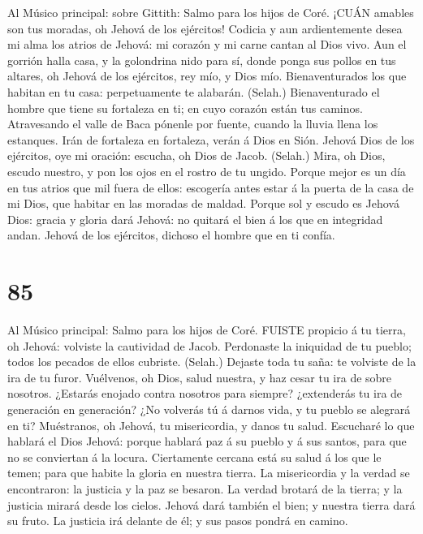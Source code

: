  Al Músico principal: sobre Gittith: Salmo para los hijos de
Coré. ¡CUÁN amables son tus moradas, oh Jehová de los ejércitos!
 Codicia y aun ardientemente desea mi alma los atrios de
Jehová: mi corazón y mi carne cantan al Dios vivo.  Aun el
gorrión halla casa, y la golondrina nido para sí, donde ponga sus pollos
en tus altares, oh Jehová de los ejércitos, rey mío, y Dios mío.
 Bienaventurados los que habitan en tu casa: perpetuamente
te alabarán. (Selah.)  Bienaventurado el hombre que tiene su
fortaleza en ti; en cuyo corazón están tus caminos. 
Atravesando el valle de Baca pónenle por fuente, cuando la lluvia llena
los estanques.  Irán de fortaleza en fortaleza, verán á Dios
en Sión.  Jehová Dios de los ejércitos, oye mi oración:
escucha, oh Dios de Jacob. (Selah.)  Mira, oh Dios, escudo
nuestro, y pon los ojos en el rostro de tu ungido.  Porque
mejor es un día en tus atrios que mil fuera de ellos: escogería antes
estar á la puerta de la casa de mi Dios, que habitar en las moradas de
maldad.  Porque sol y escudo es Jehová Dios: gracia y
gloria dará Jehová: no quitará el bien á los que en integridad andan.
 Jehová de los ejércitos, dichoso el hombre que en ti
confía.

\hypertarget{section-84}{%
\section{85}\label{section-84}}

 Al Músico principal: Salmo para los hijos de Coré. FUISTE
propicio á tu tierra, oh Jehová: volviste la cautividad de Jacob.
 Perdonaste la iniquidad de tu pueblo; todos los pecados de
ellos cubriste. (Selah.)  Dejaste toda tu saña: te volviste
de la ira de tu furor.  Vuélvenos, oh Dios, salud nuestra, y
haz cesar tu ira de sobre nosotros.  ¿Estarás enojado contra
nosotros para siempre? ¿extenderás tu ira de generación en generación?
 ¿No volverás tú á darnos vida, y tu pueblo se alegrará en
ti?  Muéstranos, oh Jehová, tu misericordia, y danos tu
salud.  Escucharé lo que hablará el Dios Jehová: porque
hablará paz á su pueblo y á sus santos, para que no se conviertan á la
locura.  Ciertamente cercana está su salud á los que le
temen; para que habite la gloria en nuestra tierra.  La
misericordia y la verdad se encontraron: la justicia y la paz se
besaron.  La verdad brotará de la tierra; y la justicia
mirará desde los cielos.  Jehová dará también el bien; y
nuestra tierra dará su fruto.  La justicia irá delante de
él; y sus pasos pondrá en camino.

